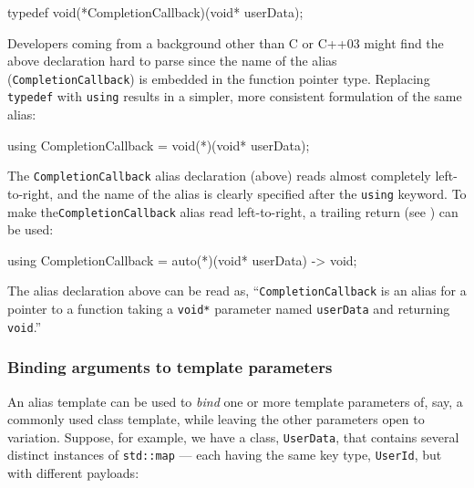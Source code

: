 \begin{emcppslisting}[language=C++]
typedef void(*CompletionCallback)(void* userData);
\end{emcppslisting}
    
\noindent Developers coming from a background other than C or C++03 might find the
above declaration hard to parse since the name of the alias
(\lstinline!CompletionCallback!) is embedded in the function pointer type.
Replacing \lstinline!typedef! with \lstinline!using! results in a simpler,
more consistent formulation of the same alias:

\begin{emcppslisting}[language=C++]
using CompletionCallback = void(*)(void* userData);
\end{emcppslisting}
    
\noindent The \lstinline!CompletionCallback! alias declaration (above) reads almost
completely left-to-right, and the name of the alias is clearly
specified after the \lstinline!using! keyword. To make the\linebreak[4] 
\lstinline!CompletionCallback! alias read left-to-right, a 
  trailing return (see ) 
can be used:

  \begin{emcppslisting}[language=C++]
  using CompletionCallback = auto(*)(void* userData) -> void;
  \end{emcppslisting}
      
\noindent The alias declaration above can be read as,
  ``\lstinline!CompletionCallback! is an alias for a pointer to a
  function taking a \lstinline!void*! parameter named \lstinline!userData! and
  returning \lstinline!void!.''

\subsubsection[Binding arguments to template parameters]{Binding arguments to template parameters}\label{binding-template-arguments}

An alias template can be used to \emph{bind} one or more template
parameters of, say, a commonly used class template, while leaving the
other parameters open to variation. Suppose, for example, we have a class, \lstinline!UserData!, that contains
several distinct instances of \lstinline!std::map! --- each
having the same key type, \lstinline!UserId!, but with different payloads:

